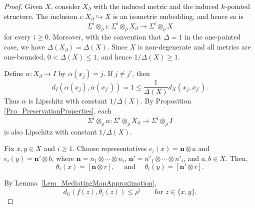 \documentclass{sn-jnl}%
\theoremstyle{thmstyleone}%
\theoremstyle{thmstyletwo}%
\theoremstyle{thmstylethree}%
\newcommand{\M}{\Sigma}
\newcommand{\Fwi}[1]{\M^{#1}\otimes_{\w}}
\newcommand{\G}{\mathbb{G}}
\newcommand{\w}{\rho}
\begin{document}
\begin{proof}
Given $X$, consider $X_\partial$ with the induced metric and the induced $k$-pointed structure.  The inclusion $\iota:X_\partial\hookrightarrow X$ is an isometric embedding, and hence so is
\begin{equation} 
\nonumber
    \Fwi{i}\iota:\Fwi{i}X_\partial\longrightarrow \Fwi{i}X
\end{equation}
for every $i\geq 0$.  Moreover, with the convention that $\Delta=1$ in the one-pointed case, we have $\Delta(X_\partial)=\Delta(X)$.  Since $X$ is non-degenerate and all metrics are one-bounded, $0<\Delta(X)\leq 1$, and hence $1/\Delta(X)\geq 1$.

Define $\alpha:X_\partial\rightarrow I$ by $\alpha(x_j)=j$.   If $j\neq j'$, then
\begin{equation} 
\nonumber
    d_I(\alpha(x_j),\alpha(x_{j'}))=1\leq \frac{1}{\Delta(X)}d_X(x_j,x_{j'}).
\end{equation}
Thus $\alpha$ is Lipschitz with constant $1/\Delta(X)$.  By Proposition \ref{Pro_PreservationProperties}, each
\begin{equation} 
\nonumber
    \Fwi{i}\alpha:\Fwi{i}X_\partial\longrightarrow \Fwi{i}I
\end{equation}
is also Lipschitz with constant $1/\Delta(X)$.

Fix $x,y\in X$ and $i\geq1$.  Choose representatives $ e_i(x)=\mathbf{n}\otimes a$ and $e_i(y)=\mathbf{n}'\otimes b$, where $\mathbf{n}=n_1\otimes\cdots\otimes n_i$, $\mathbf{n}'=n'_1\otimes\cdots\otimes n'_i$, and $a,b\in X$.  
Then,
\begin{equation} 
\nonumber
    \theta_i(x)=[\mathbf{n}\otimes r], \quad \text{ and } \quad     \theta_i(y)=[\mathbf{n}'\otimes r].
\end{equation}

By Lemma~\ref{Lem_MediatingMapApproximation},
\begin{equation}
\label{eqn:estimate_FSE_bound_1}
    d_\G(f(z),\theta_i(z))\leq\w^i \qquad \text{for } z\in\{x,y\}.
\end{equation}


\end{proof}
\end{document}
